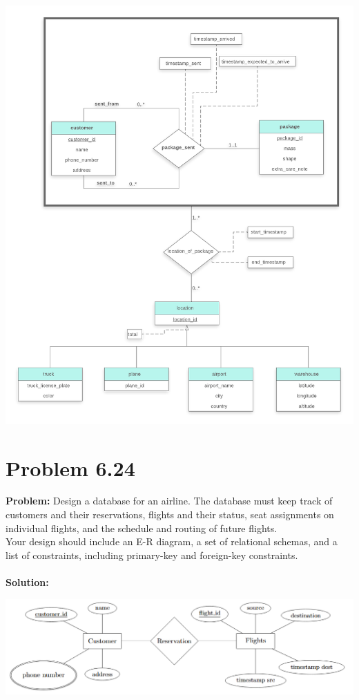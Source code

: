 \documentclass[12pt,a4paper]{article}
\begin{document}
\begin{center}
\includegraphics[width=1\textwidth]{solution_for_6.23.png}
\end{center}

\section*{Problem 6.24}

\textbf{Problem:} Design a database for an airline. The database must keep track of customers and their reservations, flights and their status, seat assignments on individual flights, and the schedule and routing of future flights.\\
Your design should include an E-R diagram, a set of relational schemas, and a list of constraints, including primary-key and foreign-key constraints.\\ \\
\textbf{Solution:}

\begin{center}
\includegraphics[width=1\textwidth]{6.24.png}
\end{center}
\end{document}
